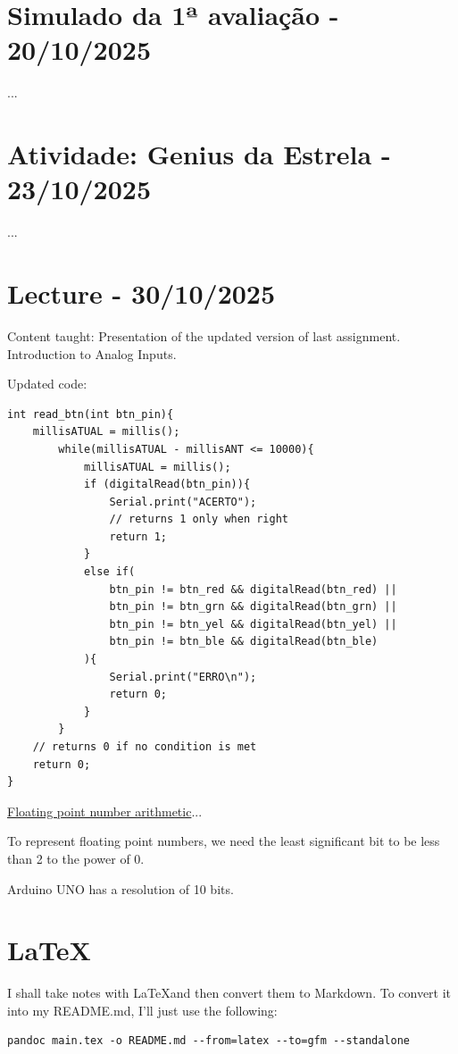 \documentclass{article}
\begin{document}
\section{Simulado da 1ª avaliação - 20/10/2025}
...

\section{Atividade: Genius da Estrela - 23/10/2025}
...

\section{Lecture - 30/10/2025}
Content taught: Presentation of the updated version of last assignment. Introduction to Analog Inputs.

Updated code:
\begin{verbatim}
int read_btn(int btn_pin){
    millisATUAL = millis();
        while(millisATUAL - millisANT <= 10000){
            millisATUAL = millis();
            if (digitalRead(btn_pin)){
                Serial.print("ACERTO");
                // returns 1 only when right
                return 1;
            }
            else if(
                btn_pin != btn_red && digitalRead(btn_red) ||
                btn_pin != btn_grn && digitalRead(btn_grn) ||
                btn_pin != btn_yel && digitalRead(btn_yel) ||
                btn_pin != btn_ble && digitalRead(btn_ble)
            ){
                Serial.print("ERRO\n");
                return 0;
            }
        }
    // returns 0 if no condition is met    
    return 0;
}
\end{verbatim}

\href{https://en.wikipedia.org/wiki/IEEE_754}{Floating point number arithmetic}...

To represent floating point numbers, we need the least significant bit to be less than 2 to the power of 0.

Arduino UNO has a resolution of 10 bits. 

\section{\LaTeX}
I shall take notes with \LaTeX and then convert them to Markdown. To convert it into my README.md, I’ll just use the following:

\begin{verbatim}
pandoc main.tex -o README.md --from=latex --to=gfm --standalone
\end{verbatim}



\end{document}
